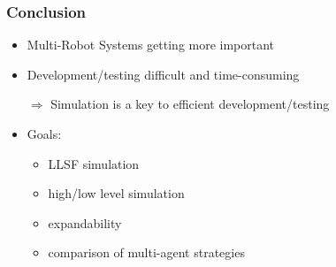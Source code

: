 \documentclass[]{beamer}
\begin{document}
\begin{frame}
\frametitle{Conclusion}
\begin{itemize}
\item Multi-Robot Systems getting more important
\item Development/testing difficult and time-consuming
\item[$\Rightarrow$] Simulation is a key to efficient development/testing
\pause
\item Goals: 
\begin{itemize}
\item LLSF simulation
\item  high/low level simulation
\item  expandability
\item  comparison of multi-agent strategies
\end{itemize}
\pause
\end{itemize}
\end{frame}
\end{document}
